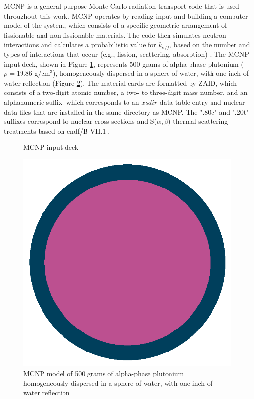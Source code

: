 MCNP is a general-purpose Monte Carlo radiation transport code that is used throughout this work.
MCNP operates by reading input and building a computer model of the system, which consists of a specific geometric arrangement of fissionable and non-fissionable materials.
The code then simulates neutron interactions and calculates a probabilistic value for $k_{eff}$, based on the number and types of interactions that occur (e.g., fission, scattering, absorption) \cite{mcnp}.
The MCNP input deck, shown in Figure \ref{fig:input}, represents 500 grams of alpha-phase plutonium ($\rho =  19.86$ g/cm$^{3}$), homogeneously dispersed in a sphere of water, with one inch of water reflection (Figure \ref{fig:mcnp}).
The material cards are formatted by ZAID, which consists of a two-digit atomic number, a two- to three-digit mass number, and an alphanumeric suffix, which corresponds to an $xsdir$ data table entry and nuclear data files that are installed in the same directory as MCNP.
The ".80c" and ".20t" suffixes correspond to nuclear cross sections and S($\alpha,\beta$) thermal scattering treatments based on \gls{endf}/B-VII.1 \cite{chadwick2011}.

\begin{figure}
  \centering
  
  \caption{MCNP input deck}
  \label{fig:input}
\end{figure}

\begin{figure}
  \centering
  \includegraphics[scale=0.3]{figures/mcnp.png}
  \caption{MCNP model of 500 grams of alpha-phase plutonium homogeneously dispersed in a sphere of water, with one inch of water reflection}
  \label{fig:mcnp}
\end{figure}

